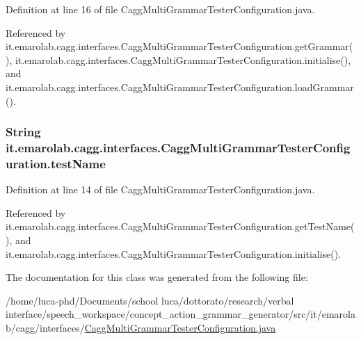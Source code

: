 Definition at line 16 of file Cagg\-Multi\-Grammar\-Tester\-Configuration.\-java.



Referenced by it.\-emarolab.\-cagg.\-interfaces.\-Cagg\-Multi\-Grammar\-Tester\-Configuration.\-get\-Grammar(), it.\-emarolab.\-cagg.\-interfaces.\-Cagg\-Multi\-Grammar\-Tester\-Configuration.\-initialise(), and it.\-emarolab.\-cagg.\-interfaces.\-Cagg\-Multi\-Grammar\-Tester\-Configuration.\-load\-Grammar().

\hypertarget{classit_1_1emarolab_1_1cagg_1_1interfaces_1_1CaggMultiGrammarTesterConfiguration_a0257b98c18078e99c10ab42c4954c2c0}{
\subsubsection[{test\-Name}]{\setlength{\rightskip}{0pt plus 5cm}String it.\-emarolab.\-cagg.\-interfaces.\-Cagg\-Multi\-Grammar\-Tester\-Configuration.\-test\-Name\hspace{0.3cm}{\ttfamily [private]}}}\label{classit_1_1emarolab_1_1cagg_1_1interfaces_1_1CaggMultiGrammarTesterConfiguration_a0257b98c18078e99c10ab42c4954c2c0}


Definition at line 14 of file Cagg\-Multi\-Grammar\-Tester\-Configuration.\-java.



Referenced by it.\-emarolab.\-cagg.\-interfaces.\-Cagg\-Multi\-Grammar\-Tester\-Configuration.\-get\-Test\-Name(), and it.\-emarolab.\-cagg.\-interfaces.\-Cagg\-Multi\-Grammar\-Tester\-Configuration.\-initialise().



The documentation for this class was generated from the following file\-:\begin{DoxyCompactItemize}
\item 
/home/luca-\/phd/\-Documents/school luca/dottorato/research/verbal interface/speech\-\_\-workspace/concept\-\_\-action\-\_\-grammar\-\_\-generator/src/it/emarolab/cagg/interfaces/\hyperlink{CaggMultiGrammarTesterConfiguration_8java}{Cagg\-Multi\-Grammar\-Tester\-Configuration.\-java}\end{DoxyCompactItemize}
